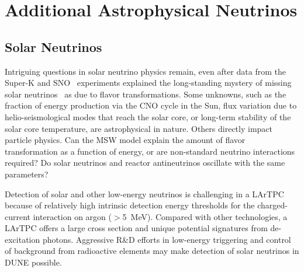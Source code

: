 




\section{Additional Astrophysical Neutrinos}
\label{sec:physics-snblowe-other}

\subsection{Solar Neutrinos}

Intriguing questions in solar neutrino physics remain,
even after data
from the Super-K and SNO~\cite{Fukuda:2001nj,Ahmad:2001an}
experiments explained the long-standing mystery of missing solar
neutrinos~\cite{Cleveland:1998nv} as due to flavor
transformations. 
Some unknowns, such as the fraction of energy production via the CNO
cycle in the Sun, flux variation due to helio-seismological modes that
reach the solar core, or long-term stability of the solar core
temperature, are astrophysical in nature. Others directly impact
particle physics. Can the MSW model explain the amount of flavor
transformation as a function of energy, or are non-standard neutrino
interactions required?  Do solar neutrinos and reactor antineutrinos
oscillate with the same parameters? 

Detection of solar and other low-energy neutrinos is challenging in
a LArTPC because of relatively high intrinsic detection energy thresholds for
the charged-current interaction on argon ($>$\SI{5}{\MeV}). 
Compared with other technologies, a LArTPC offers a large
cross section and unique potential signatures from de-excitation
photons. Aggressive R\&D efforts in low-energy triggering and
control of background from radioactive elements may make detection
of solar neutrinos in DUNE possible.

